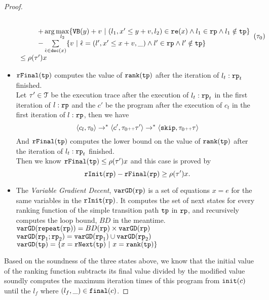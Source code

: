 \begin{proof}
\begin{itemize}
\[\begin{array}{l}
{\begin{array}{l}
           \\ \qquad 
           + \arg\max\limits_{l_2 }
               \left\{ \varinvar(y) + v ~\middle\vert~ 
               (l_1, x' \leq y + v, l_2) \in \reset(x) \land l_1 \in \rprog \land l_1 \notin \tpath\right\}
           \\ \qquad 
           - \sum\limits_{ \absevent \in \dec(x) }\left\{ 
           v 
           ~\middle\vert~ \absevent = (l', x' \leq x + v, \_) \land l' \in \rprog \land l' \notin \tpath \right\}
         \end{array}
     }(\trace_0) \\
     \leq \env(\trace') x
   \end{array}
   \]
 \item $\mathtt{rFinal}(\mathtt{tp})$ computes the value of $\mathtt{rank}(\mathtt{tp})$ after the iteration of $l_t:\mathtt{rp}_t$ finished.
 \\
 Let $\mathtt{\tau}' \in \mathcal{T}$ be the execution trace after the execution of $l_t: \mathtt{rp}_t$ in the first iteration of $l:\mathtt{rp}$ and the $c'$ be the program after the execution of $c_t$ in the first iteration of $l:\mathtt{rp}$,  then we have
 \[
   \langle c_l, \mathtt{\tau}_0 \rangle \to^* \langle c', \mathtt{\tau}_0 {\scriptscriptstyle ++} \mathtt{\tau}' \rangle \to^* \langle \mathtt{skip}, \mathtt{\tau}_0 {\scriptscriptstyle ++} \mathtt{\tau} \rangle
 \]
And $\mathtt{rFinal}(\mathtt{tp})$ computes the lower bound on the value of $\mathtt{rank}(\mathtt{tp})$ after the iteration of $l_t:\mathtt{rp}_t$ finished.
 \\
Then we know $\mathtt{rFinal}(\mathtt{tp}) \leq \rho(\mathtt{\tau}') x$ and this case is proved by
\[
  \mathtt{rInit}(\mathtt{rp}) - \mathtt{rFinal}(\mathtt{rp}) \geq \rho(\mathtt{\tau}') x.
\]
\item  The \emph{Variable Gradient Decent}, 
 $\mathtt{varGD}(\mathtt{rp})$
 is a set of equations $x = e$ for the same variables in the $\mathtt{rInit}(\mathtt{rp})$.
 It computes the set of next states for every ranking function of the simple transition path $\mathtt{tp}$ in $\mathtt{rp}$,
 and recursively computes the loop bound, $BD$ in the meantime.
 \\
 {$\mathtt{varGD}(\mathtt{repeat}(\mathtt{rp})) =  BD(\mathtt{rp})  \times
{\ensuremath{\mathtt{varGD}}(\ensuremath{\mathtt{rp}})}$}
 \\
 $\mathtt{varGD}(\mathtt{rp}_1;\mathtt{rp}_2) =  \mathtt{varGD}(\mathtt{rp}_1) \cup \mathtt{varGD}(\mathtt{rp}_2)$
 \\
 $\varGD(\tpath) =  \left\{x = \rfnext(\tpath) ~|~ x = \locbound(\tpath) \right\} $  
\end{itemize}
Based on the soundness of the three states above, we know that the initial value of the ranking function
subtracts its final value divided by the modified value soundly computes the maximum iteration times of this program from $\mathtt{init}(c)$ until the $l_f$ where $(l_f, \_) \in \mathtt{final}(c)$.

\end{proof}

